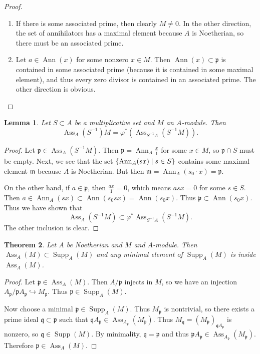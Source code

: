 \documentclass[leqno, openany]{memoir}
\newtheorem{thm}{Theorem}[section]
\newtheorem{lem}[thm]{Lemma}
\theoremstyle{definition}
\theoremstyle{remark}
\theoremstyle{plain}
\theoremstyle{definition}
\theoremstyle{remark}
\newcommand{\mf}[1]{\mathfrak{#1}}
\DeclareMathOperator{\Supp}{Supp}
\DeclareMathOperator{\Ann}{Ann}
\DeclareMathOperator{\Ass}{Ass}
\begin{document}
\begin{proof}
    \begin{enumerate}
        \item If there is some associated prime, then clearly $M \neq 0$. In the other direction, the set of annihilators has a maximal element because $A$ is Noetherian, so there must be an associated prime.
        \item Let $a \in \Ann(x)$ for some nonzero $x \in M$. Then $\Ann(x) \subset \mf{p}$ is contained in some associated prime (because it is contained in some maximal element), and thus every zero divisor is contained in an associated prime. The other direction is obvious. \qedhere
    \end{enumerate}
\end{proof}

\begin{lem}
    Let $S \subset A$ be a multiplicative set and $M$ an $A$-module. Then
    \[ \Ass_A(S^{-1})M = \varphi^*(\Ass_{S^{-1}A}(S^{-1}M)). \]
\end{lem}

\begin{proof}
    Let $\mf{p} \in \Ass_A(S^{-1}M)$. Then $\mf{p} = \Ann_A \frac{x}{1}$ for some $x \in M$, so $\mf{p} \cap S$ must be empty. Next, we see that the set $\qty{\Ann_A(sx) \mid s \in S}$ contains some maximal element $\mf{m}$ because $A$ is Noetherian. But then $\mf{m} = \Ann_A(s_0 \cdot x) = \mf{p}$.

    On the other hand, if $a \in \mf{p}$, then $\frac{ax}{1} = 0$, which means $asx = 0$ for some $s \in S$. Then $a \in \Ann_A(sx) \subset \Ann(s_0 sx) = \Ann(s_0 x)$. Thus $\mf{p} \subset \Ann(s_0 x)$. Thus we have shown that
    \[ \Ass_A(S^{-1}M) \subset \varphi^* \Ass_{S^{-1}A} (S^{-1}M). \]
    The other inclusion is clear.
\end{proof}

\begin{thm}
    Let $A$ be Noetherian and $M$ and $A$-module. Then $\Ass_A(M) \subset \Supp_A(M)$ and any minimal element of $\Supp_A(M)$ is inside $\Ass_A(M)$.
\end{thm}

\begin{proof}
    Let $\mf{p} \in \Ass_A(M)$. Then $A/\mf{p}$ injects in $M$, so we have an injection $A_{\mf{p}} / \mf{p}A_{\mf{p}} \hookrightarrow M_{\mf{p}}$. Thus $\mf{p} \in \Supp_A(M)$.

    Now choose a minimal $\mf{p} \in \Supp_A(M)$. Thus $M_{\mf{p}}$ is nontrivial, so there exists a prime ideal $\mf{q} \subset \mf{p}$ such that $\mf{q} A_{\mf{p}} \in \Ass_{A_{\mf{p}}}(M_{\mf{p}})$. Thus $M_{\mf{q}} = (M_{\mf{p}})_{\mf{q}A_{\mf{p}}}$ is nonzero, so $\mf{q} \in \Supp(M)$. By minimality, $\mf{q} = \mf{p}$ and thus $\mf{p}A_{\mf{p}} \in \Ass_{A_{\mf{p}}} (M_{\mf{p}})$. Therefore $\mf{p} \in \Ass_A(M)$.
\end{proof}
\end{document}
